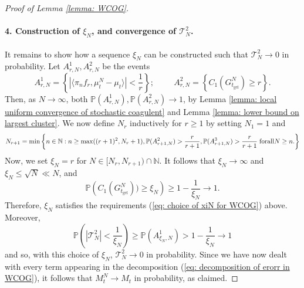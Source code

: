 \begin{proof}[Proof of Lemma \ref{lemma: WCOG}]
       \paragraph{4. Construction of $\xi_N$, and convergence of $\mathcal{T}^2_N$.} It remains to show how a sequence $\xi_N$ can be constructed such that $\mathcal{T}^2_N \rightarrow 0$ in probability. Let $A^1_{r,N}, A^2_{r,N}$ be the events \begin{equation} \label{eq: definition of A1rn for WCOG}
       A^1_{r,N}=\left\{ |\langle \pi_n f_r, \mu^N_t-\mu_t\rangle|<\frac{1}{r}\right\}; \hspace{1cm}
       A^2_{r,N}=\left\{C_1(G^N_{t_\mathrm{gel}}) \geq r\right\}.
   \end{equation} Then, as $N\rightarrow \infty$, both $\mathbb{P}(A^1_{r,N}), \mathbb{P}(A^2_{r,N}) \rightarrow 1$, by Lemma \ref{lemma: local uniform convergence of stochastic coagulent} and Lemma \ref{lemma: lower bound on largest cluster}. We now define $N_r$ inductively for $r\geq 1$ by setting $N_1=1$ and \begin{equation}
       \label{eq: recursive definition of Nr for WCOG} N_{r+1}=\min\left\{n \in \mathbb{N}: n\geq \max((r+1)^2, N_r+1),  \mathbb{P}(A^2_{r+1,N})>\frac{r}{r+1},  \mathbb{P}(A^3_{r+1,N})>\frac{r}{r+1} \hspace{0.1cm} \mathrm{for all }N\geq n. \right\}
   \end{equation} Now, we set $\xi_N=r$ for $N\in [N_r, N_{r+1})\cap\mathbb{N}.$ It follows that $\xi_N \rightarrow \infty$ and $\xi_N\leq \sqrt{N}\ll N$, and \begin{equation}
       \mathbb{P}\left(C_1(G^N_{t_\mathrm{gel}}))\geq \xi_N\right)\ge 1-\frac{1}{\xi_N} \rightarrow 1. 
   \end{equation} Therefore, $\xi_N$ satisfies the requirements (\ref{eq: choice of xiN for WCOG}) above. Moreover, \begin{equation}
       \mathbb{P}\left(|\mathcal{T}^2_N| <\frac{1}{\xi_N}\right) \ge \mathbb{P}\left(A^1_{\xi_N,N}\right) > 1-\frac{1}{\xi_N}\rightarrow 1
   \end{equation} and so, with this choice of $\xi_N$, $\mathcal{T}^2_N \rightarrow 0$ in probability. Since we have now dealt with every term appearing in the decomposition (\ref{eq: decomposition of erorr in WCOG}), it follows that $M^N_t\rightarrow M_t$ in probability, as claimed. \end{proof} 
